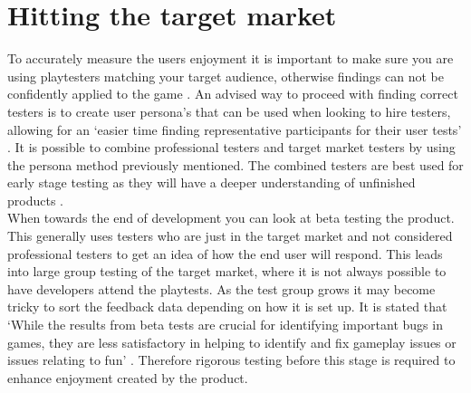 \documentclass{scrartcl}
\begin{document}
	\section{Hitting the target market}
	To accurately measure the users enjoyment it is important to make sure you are using playtesters matching your target audience, otherwise findings can not be confidently applied to the game \cite{moosajee2016games}. An advised way to proceed with finding correct testers is to create user persona's that can be used when looking to hire testers, allowing for an `easier time finding representative participants for their user tests' \cite[p.3163]{moosajee2016games}. It is possible to combine professional testers and target market testers by using the persona method previously mentioned. The combined testers are best used for early stage testing as they will have a deeper understanding of unfinished products \cite{ollila2008using}.\\ When towards the end of development you can look at beta testing the product. This generally uses testers who are just in the target market and not considered professional testers to get an idea of how the end user will respond. This leads into large group testing of the target market, where it is not always possible to have developers attend the playtests. As the test group grows it may become tricky to sort the feedback data depending on how it is set up. It is stated that `While the results from beta tests are crucial for identifying important bugs in games, they are less satisfactory in helping to	identify and fix gameplay issues or issues relating to fun' \cite[p.4]{davis2005survey}. Therefore rigorous testing before this stage is required to enhance enjoyment created by the product.
	
\end{document}
